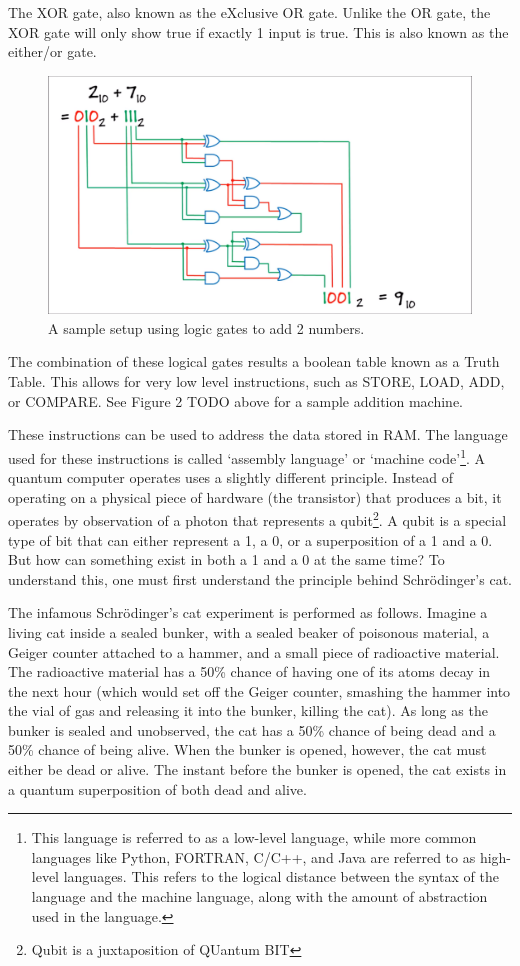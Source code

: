 \documentclass[10pt,journal,compsoc]{IEEEtran}
\begin{document}
The XOR gate, also known as the eXclusive OR gate. Unlike the OR gate, the XOR gate will only show true if exactly 1 input is true. This is also known as the either/or gate.
\begin{figure}
	\centering
	\includegraphics[width=0.7\linewidth]{adder}
	\caption{A sample setup using logic gates to add 2 numbers.}
	\label{A sample setup to add two 3 digit binary numbers.}
\end{figure}

The combination of these logical gates results a boolean table known as a Truth Table\cite{Surrey}. This allows for very low level instructions, such as STORE, LOAD, ADD, or COMPARE. See Figure 2 TODO above for a sample addition machine.

These instructions can be used to address the data stored in RAM. The language used for these instructions is called `assembly language' or `machine code'\footnote{This language is referred to as a low-level language, while more common languages like Python, FORTRAN, C/C++, and Java are referred to as high-level languages. This refers to the logical distance between the syntax of the language and the machine language, along with the amount of abstraction used in the language.}.
A quantum computer operates uses a slightly different principle. Instead of operating on a physical piece of hardware (the transistor) that produces a bit, it operates by observation of a photon that represents a qubit\footnote{Qubit is a juxtaposition of QUantum BIT}. A qubit is a special type of bit that can either represent a 1, a 0, or a superposition of a 1 and a 0. But how can something exist in both a 1 and a 0 at the same time? To understand this, one must first understand the principle behind Schr\"{o}dinger’s cat. 


The infamous Schr\"{o}dinger's cat experiment is performed as follows. Imagine a living cat inside a sealed bunker, with a sealed beaker of poisonous material, a Geiger counter attached to a hammer, and a small piece of radioactive material. The radioactive material has a 50\% chance of having one of its atoms decay in the next hour (which would set off the Geiger counter, smashing the hammer into the vial of gas and releasing it into the bunker, killing the cat). As long as the bunker is sealed and unobserved, the cat has a 50\% chance of being dead and a 50\% chance of being alive. When the bunker is opened, however, the cat must either be dead or alive. The instant before the bunker is opened, the cat exists in a quantum superposition of both dead and alive\cite{NatGeo}. 
\end{document}
